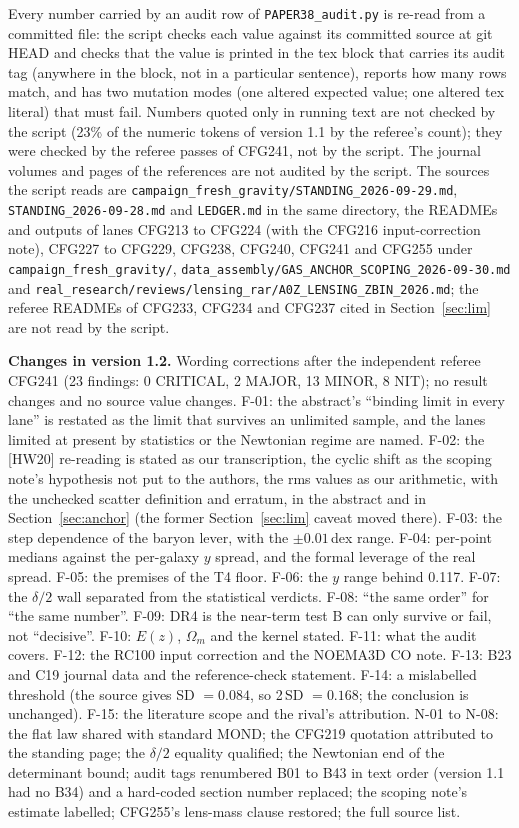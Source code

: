 \documentclass[10pt]{article}
\newcommand{\fpath}[1]{\nolinkurl{#1}}
\begin{document}
Every number carried by an audit row of \fpath{PAPER38_audit.py} is re-read from a committed file: the script checks each value against its committed source at git HEAD and checks that the value is printed in the tex block that carries its audit tag (anywhere in the block, not in a particular sentence), reports how many rows match, and has two mutation modes (one altered expected value; one altered tex literal) that must fail. Numbers quoted only in running text are not checked by the script (23\% of the numeric tokens of version 1.1 by the referee's count); they were checked by the referee passes of CFG241, not by the script. The journal volumes and pages of the references are not audited by the script. The sources the script reads are \fpath{campaign_fresh_gravity/STANDING_2026-09-29.md}, \fpath{STANDING_2026-09-28.md} and \fpath{LEDGER.md} in the same directory, the READMEs and outputs of lanes CFG213 to CFG224 (with the CFG216 input-correction note), CFG227 to CFG229, CFG238, CFG240, CFG241 and CFG255 under \fpath{campaign_fresh_gravity/}, \fpath{data_assembly/GAS_ANCHOR_SCOPING_2026-09-30.md} and \fpath{real_research/reviews/lensing_rar/A0Z_LENSING_ZBIN_2026.md}; the referee READMEs of CFG233, CFG234 and CFG237 cited in Section~\ref{sec:lim} are not read by the script.

\textbf{Changes in version 1.2.} Wording corrections after the independent referee CFG241 (23 findings: 0 CRITICAL, 2 MAJOR, 13 MINOR, 8 NIT); no result changes and no source value changes. F-01: the abstract's ``binding limit in every lane'' is restated as the limit that survives an unlimited sample, and the lanes limited at present by statistics or the Newtonian regime are named. F-02: the [HW20] re-reading is stated as our transcription, the cyclic shift as the scoping note's hypothesis not put to the authors, the rms values as our arithmetic, with the unchecked scatter definition and erratum, in the abstract and in Section~\ref{sec:anchor} (the former Section~\ref{sec:lim} caveat moved there). F-03: the step dependence of the baryon lever, with the $\pm0.01$\,dex range. F-04: per-point medians against the per-galaxy $y$ spread, and the formal leverage of the real spread. F-05: the premises of the T4 floor. F-06: the $y$ range behind 0.117. F-07: the $\delta/2$ wall separated from the statistical verdicts. F-08: ``the same order'' for ``the same number''. F-09: DR4 is the near-term test B can only survive or fail, not ``decisive''. F-10: $E(z)$, $\Omega_m$ and the kernel stated. F-11: what the audit covers. F-12: the RC100 input correction and the NOEMA3D CO note. F-13: B23 and C19 journal data and the reference-check statement. F-14: a mislabelled threshold (the source gives SD $=0.084$, so 2\,SD $=0.168$; the conclusion is unchanged). F-15: the literature scope and the rival's attribution. N-01 to N-08: the flat law shared with standard MOND; the CFG219 quotation attributed to the standing page; the $\delta/2$ equality qualified; the Newtonian end of the determinant bound; audit tags renumbered B01 to B43 in text order (version 1.1 had no B34) and a hard-coded section number replaced; the scoping note's estimate labelled; CFG255's lens-mass clause restored; the full source list.
\end{document}
